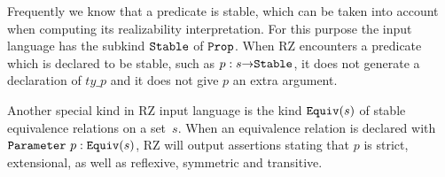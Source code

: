 Frequently we know that a predicate is stable, which can be taken into
account when computing its realizability interpretation. For this
purpose the input language has the subkind $\mathtt{Stable}$ of $\mathtt{Prop}$.
When RZ encounters a predicate which is declared to be stable, such as
$p : s{\to}\mathtt{Stable}$, it does not generate a declaration of
$ty\_p$ and it does not give $p$ an extra argument.

Another special kind in RZ input language is the kind $\mathtt{Equiv}(s)$ of
stable equivalence relations on a set~$s$. When an equivalence
relation is declared with $\mathtt{Parameter}\ p : \mathtt{Equiv}(s)$, RZ will output
assertions stating that $p$ is strict, extensional, as well as
reflexive, symmetric and transitive.



